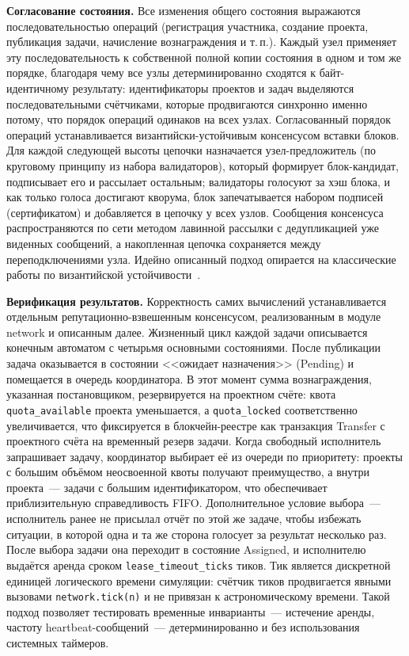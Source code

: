 \documentclass[a4paper,11pt]{extarticle}
\begin{document}
\textbf{Согласование состояния.} Все изменения общего состояния выражаются
последовательностью операций (регистрация участника, создание проекта,
публикация задачи, начисление вознаграждения и т.\,п.). Каждый узел применяет
эту последовательность к собственной полной копии состояния в одном и том же
порядке, благодаря чему все узлы детерминированно сходятся к байт-идентичному
результату: идентификаторы проектов и задач выделяются последовательными
счётчиками, которые продвигаются синхронно именно потому, что порядок операций
одинаков на всех узлах. Согласованный порядок операций устанавливается
византийски-устойчивым консенсусом вставки блоков. Для каждой следующей высоты
цепочки назначается узел-предложитель (по круговому принципу из набора
валидаторов), который формирует блок-кандидат, подписывает его и рассылает
остальным; валидаторы голосуют за хэш блока, и как только голоса достигают
кворума, блок запечатывается набором подписей (сертификатом) и добавляется в
цепочку у всех узлов. Сообщения консенсуса распространяются по сети методом
лавинной рассылки с дедупликацией уже виденных сообщений, а накопленная цепочка
сохраняется между переподключениями узла. Идейно описанный подход опирается на
классические работы по византийской устойчивости~\cite{byzantine_generals,pbft}.

\textbf{Верификация результатов.} Корректность самих вычислений
устанавливается отдельным репутационно-взвешенным консенсусом, реализованным в
модуле network и описанным далее. Жизненный цикл каждой
задачи описывается конечным автоматом с четырьмя основными состояниями. После
публикации задача оказывается в состоянии <<ожидает назначения>> (Pending) и
помещается в очередь координатора. В этот момент сумма вознаграждения,
указанная постановщиком, резервируется на проектном счёте: квота
\texttt{quota\_available} проекта уменьшается, а \texttt{quota\_locked}
соответственно увеличивается, что фиксируется в блокчейн-реестре как
транзакция Transfer с проектного счёта на временный резерв задачи. Когда
свободный исполнитель запрашивает задачу, координатор выбирает её из очереди
по приоритету: проекты с большим объёмом неосвоенной квоты получают
преимущество, а внутри проекта~--- задачи с большим идентификатором, что
обеспечивает приблизительную справедливость FIFO. Дополнительное условие
выбора~--- исполнитель ранее не присылал отчёт по этой же задаче, чтобы
избежать ситуации, в которой одна и та же сторона голосует за результат
несколько раз. После выбора задачи она переходит в состояние Assigned, и
исполнителю выдаётся аренда сроком \texttt{lease\_timeout\_ticks} тиков. Тик
является дискретной единицей логического времени симуляции: счётчик тиков
продвигается явными вызовами \texttt{network.tick(n)} и не привязан к
астрономическому времени. Такой подход позволяет тестировать временные
инварианты~--- истечение аренды, частоту heartbeat-сообщений~--- детерминированно
и без использования системных таймеров.
\end{document}
